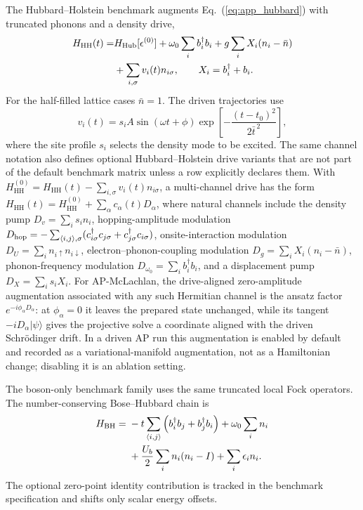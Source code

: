 \documentclass[
  reprint,
  amsmath,
  amssymb,
  aps,
  pra,
  nofootinbib,
  superscriptaddress,
  floatfix
]{revtex4-2}
\newcommand{\hh}{\mathrm{HH}}
\newcommand{\ket}[1]{|#1\rangle}
\begin{document}
The Hubbard--Holstein benchmark augments Eq.~(\ref{eq:app_hubbard}) with truncated phonons and a density drive,
\begin{align}
H_{\hh}(t)=&H_{\rm Hub}[\epsilon^{(0)}]
+\omega_0\sum_i b_i^{\dagger}b_i
+g\sum_i X_i(n_i-\bar n)
\nonumber\\
&+\sum_{i,\sigma}v_i(t)n_{i\sigma},
\qquad
X_i=b_i^\dagger+b_i .
\label{eq:app_hh}
\end{align}
For the half-filled lattice cases $\bar n=1$. The driven trajectories use
\begin{equation}
v_i(t)=s_i A\sin(\omega t+\phi)
\exp\left[-\frac{(t-t_0)^2}{2\bar t^{\,2}}\right],
\label{eq:app_drive_waveform}
\end{equation}
where the site profile $s_i$ selects the density mode to be excited.
The same channel notation also defines optional Hubbard--Holstein drive variants that are not part of the default benchmark matrix unless a row explicitly declares them.  With $H_{\hh}^{(0)}=H_{\hh}(t)-\sum_{i,\sigma}v_i(t)n_{i\sigma}$, a multi-channel drive has the form $H_{\hh}(t)=H_{\hh}^{(0)}+\sum_{\alpha}c_{\alpha}(t)D_{\alpha}$, where natural channels include the density pump $D_v=\sum_i s_i n_i$, hopping-amplitude modulation $D_{\rm hop}=-\sum_{\langle i,j\rangle,\sigma}(c_{i\sigma}^{\dagger}c_{j\sigma}+c_{j\sigma}^{\dagger}c_{i\sigma})$, onsite-interaction modulation $D_U=\sum_i n_{i\uparrow}n_{i\downarrow}$, electron--phonon-coupling modulation $D_g=\sum_i X_i(n_i-\bar n)$, phonon-frequency modulation $D_{\omega_0}=\sum_i b_i^{\dagger}b_i$, and a displacement pump $D_X=\sum_i s_iX_i$.  For AP-McLachlan, the drive-aligned zero-amplitude augmentation associated with any such Hermitian channel is the ansatz factor $e^{-i\phi_{\alpha}D_{\alpha}}$: at $\phi_{\alpha}=0$ it leaves the prepared state unchanged, while its tangent $-iD_{\alpha}\ket{\psi}$ gives the projective solve a coordinate aligned with the driven Schr\"odinger drift.  In a driven AP run this augmentation is enabled by default and recorded as a variational-manifold augmentation, not as a Hamiltonian change; disabling it is an ablation setting.

The boson-only benchmark family uses the same truncated local Fock operators. The number-conserving Bose--Hubbard chain is
\begin{align}
H_{\rm BH}={}&
-t\sum_{\langle i,j\rangle}
\left(b_i^\dagger b_j+b_j^\dagger b_i\right)
+\omega_0\sum_i n_i
\nonumber\\
&
+\frac{U_b}{2}\sum_i n_i(n_i-I)
+\sum_i\epsilon_i n_i .
\label{eq:app_bose_hubbard}
\end{align}
The optional zero-point identity contribution is tracked in the benchmark specification and shifts only scalar energy offsets.
\end{document}

